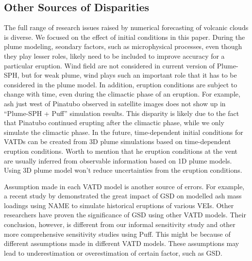 \documentclass[utf8]{frontiersSCNS} %
\begin{document}
\subsection{Other Sources of Disparities}
The full range of research issues raised by numerical forecasting of volcanic clouds is diverse. We focused on the effect of initial conditions in this paper. During the plume modeling, seondary factors, such as microphysical processes, even though they play lesser roles, likely need to be included to improve accuracy for a particular eruption. Wind field are not considered in current version of Plume-SPH, but for weak plume, wind plays such an important role that it has to be considered in the plume model. In addition, eruption conditions are subject to change with time, even during the climactic phase of an eruption. For example, ash just west of Pinatubo observed in satellite images does not show up in ``Plume-SPH + Puff'' simulation results. This disparity is likely due to the fact that Pinatubo continued erupting after the climactic phase, while we only simulate the climactic phase. In the future, time-dependent initial conditions for VATDs can be created from 3D plume simulations based on time-dependent eruption conditions. Worth to mention that he eruption conditions at the vent are usually inferred from observable information based on 1D plume models. Using 3D plume model won't reduce uncertainties from the eruption conditions.

Assumption made in each VATD model is another source of errors. For example, a recent study by \citet{osman2020sensitivity} demonstrated the great impact of GSD on modelled ash mass loadings using NAME\citep{jones2007uk} to simulate historical eruptions of various VEIs. Other researchers \citep{beckett2015sensitivity,scollo2008parametric} have proven the significance of GSD using other VATD models. Their conclusion, however, is different from our informal sensitivity study and other more comprehensive sensitivity studies using Puff. This might be because of different assumptions made in different VATD models. These assumptions may lead to underestimation or overestimation of certain factor, such as GSD.
\end{document}

